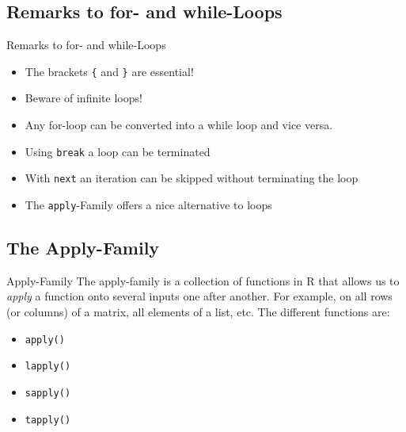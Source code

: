 \documentclass[xcolor=dvipsnames, aspectratio = 169]{beamer}
\begin{document}
\subsection*{Remarks to for- and while-Loops}

\begin{frame}[fragile]{Remarks to for- and while-Loops}
  \begin{itemize}
    \item The brackets \verb+{+ and \verb+}+ are essential!
    \item Beware of infinite loops!
    \item Any for-loop can be converted into a while loop and vice versa.
    \item Using \verb+break+ a loop can be terminated
    \item With \verb+next+ an iteration can be skipped without terminating the loop
    \item The \verb+apply+-Family offers a nice alternative to loops
    \end{itemize}
\end{frame}

\subsection*{The Apply-Family}

\begin{frame}[fragile]{Apply-Family}
	The apply-family is a collection of functions in R that allows us to \textit{apply} a function onto several inputs one after another. For example, on all rows (or columns) of a matrix, all elements of a list, etc. The different functions are:
	\begin{itemize}
		\item \verb+apply()+
		\item \verb+lapply()+
		\item \verb+sapply()+
		\item \verb+tapply()+
	\end{itemize}
\end{frame}
\end{document}
